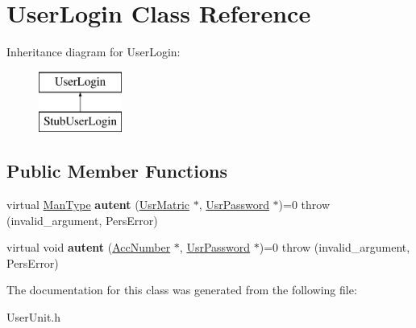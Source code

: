 \hypertarget{classUserLogin}{\section{User\-Login Class Reference}
\label{d4/de1/classUserLogin}
}
Inheritance diagram for User\-Login\-:\begin{figure}[H]
\begin{center}
\leavevmode
\includegraphics[height=2.000000cm]{d4/de1/classUserLogin}
\end{center}
\end{figure}
\subsection*{Public Member Functions}
\begin{DoxyCompactItemize}
\item 
\hypertarget{classUserLogin_a15141f463faedae30e40115658fcc0b9}{virtual \hyperlink{classUsrType}{Man\-Type} {\bfseries autent} (\hyperlink{classUsrMatric}{Usr\-Matric} $\ast$, \hyperlink{classUsrPassword}{Usr\-Password} $\ast$)=0  throw (invalid\-\_\-argument, Pers\-Error)}\label{d4/de1/classUserLogin_a15141f463faedae30e40115658fcc0b9}

\item 
\hypertarget{classUserLogin_a7163b2b97915fd0e3e5d3f76c2af44da}{virtual void {\bfseries autent} (\hyperlink{classAccNumber}{Acc\-Number} $\ast$, \hyperlink{classUsrPassword}{Usr\-Password} $\ast$)=0  throw (invalid\-\_\-argument, Pers\-Error)}\label{d4/de1/classUserLogin_a7163b2b97915fd0e3e5d3f76c2af44da}

\end{DoxyCompactItemize}


The documentation for this class was generated from the following file\-:\begin{DoxyCompactItemize}
\item 
User\-Unit.\-h\end{DoxyCompactItemize}

